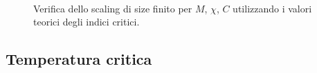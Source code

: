 \documentclass[a4paper,11pt]{article}
\begin{document}
	\begin{figure}[htb]
         \\
        \caption{Verifica dello scaling di size finito per $M$, $\chi$, $C$ utilizzando i valori teorici degli indici critici.}
        \label{fig:mchiC_scaling_plot}
	\end{figure}

	
	\subsection{Temperatura critica}
	
\end{document}
